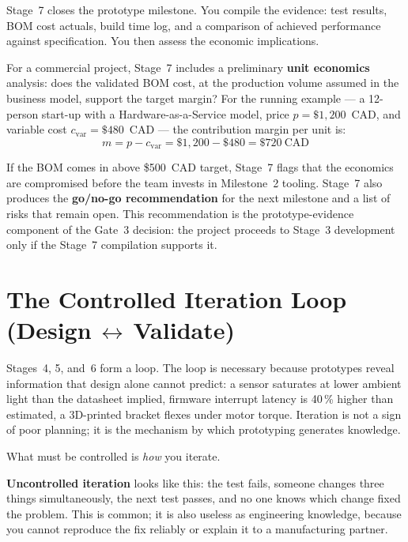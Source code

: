 Stage~7 closes the prototype milestone.
You compile the evidence: test results, BOM cost actuals, build time log,
and a comparison of achieved performance against specification.
You then assess the economic implications.

For a commercial project, Stage~7 includes a preliminary
\textbf{unit economics} analysis:
does the validated BOM cost, at the production volume assumed in the business
model, support the target margin?
For the running example --- a 12-person start-up with a
Hardware-as-a-Service model, price $p = \$1{,}200$~CAD, and variable cost
$c_{\text{var}} = \$480$~CAD --- the contribution margin per unit is:
\begin{equation}
  \label{eq:ch3-margin}
  m = p - c_{\text{var}} = \$1{,}200 - \$480 = \$720~\text{CAD}
\end{equation}

If the BOM comes in above \$500~CAD target, Stage~7 flags that the economics
are compromised before the team invests in Milestone~2 tooling.
Stage~7 also produces the \textbf{go/no-go recommendation}
for the next milestone and a list of risks that remain open.
This recommendation is the prototype-evidence component of the Gate~3
decision: the project proceeds to Stage~3 development only if the Stage~7
compilation supports it.

\section{The Controlled Iteration Loop (Design\,$\leftrightarrow$\,Validate)}
\label{sec:ch3-loop}

Stages~4, 5, and~6 form a loop.
The loop is necessary because prototypes reveal information that design
alone cannot predict: a sensor saturates at lower ambient light than the
datasheet implied, firmware interrupt latency is 40\,\% higher than estimated,
a 3D-printed bracket flexes under motor torque.
Iteration is not a sign of poor planning; it is the mechanism by which
prototyping generates knowledge.

What must be controlled is \emph{how} you iterate.

\textbf{Uncontrolled iteration} looks like
this: the test fails, someone changes three things simultaneously, the next
test passes, and no one knows which change fixed the problem.
This is common; it is also useless as engineering knowledge, because you
cannot reproduce the fix reliably or explain it to a manufacturing partner.


